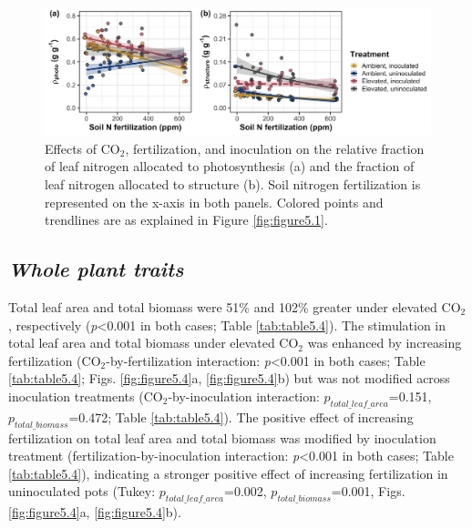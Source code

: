 \newpage
    \begin{figure}
        \centering
        \includegraphics[width=\columnwidth]{ch5_NxCO2xI/figs/NxCO2xI_fig3_propN.jpg}
        \caption[Effects of CO$_2$, fertilization, and inoculation on the relative fraction of leaf nitrogen allocated to photosynthesis and the fraction of leaf nitrogen allocated to structure]{Effects of CO$_2$, fertilization, and inoculation on the relative fraction of leaf nitrogen allocated to photosynthesis (a) and the fraction of leaf nitrogen allocated to structure (b). Soil nitrogen fertilization is represented on the x-axis in both panels. Colored points and trendlines are as explained in Figure \ref{fig:figure5.1}.}
        \label{fig:figure5.3}
    \end{figure}
\clearpage

\subsection{\textit{Whole plant traits}}
\noindent Total leaf area and total biomass were 51\% and 102\% greater under elevated CO$_2$, respectively (\textit{p}<0.001 in both cases; Table \ref{tab:table5.4}). The stimulation in total leaf area and total biomass under elevated CO$_2$ was enhanced by increasing fertilization (CO$_2$-by-fertilization interaction: \textit{p}<0.001 in both cases; Table \ref{tab:table5.4}; Figs. \ref{fig:figure5.4}a, \ref{fig:figure5.4}b) but was not modified across inoculation treatments (CO$_2$-by-inoculation interaction: $p_{total\_leaf\_area}$=0.151, $p_{total\_biomass}$=0.472; Table \ref{tab:table5.4}). The positive effect of increasing fertilization on total leaf area and total biomass was modified by inoculation treatment (fertilization-by-inoculation interaction: \textit{p}<0.001 in both cases; Table \ref{tab:table5.4}), indicating a stronger positive effect of increasing fertilization in uninoculated pots (Tukey: $p_{total\_leaf\_area}$=0.002, $p_{total\_biomass}$=0.001, Figs. \ref{fig:figure5.4}a, \ref{fig:figure5.4}b).

